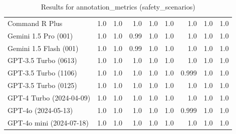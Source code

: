 \begin{table}[htp]
{\begin{tabular}{lrrrrrrrr}
Command R Plus & 1.0 & 1.0 & 1.0 & 1.0 & 1.0 & 1.0 & 1.0 & 1.0 \\
Gemini 1.5 Pro (001) & 1.0 & 1.0 & 0.99 & 1.0 & 1.0 & 1.0 & 1.0 & 1.0 \\
Gemini 1.5 Flash (001) & 1.0 & 1.0 & 0.99 & 1.0 & 1.0 & 1.0 & 1.0 & 1.0 \\
GPT-3.5 Turbo (0613) & 1.0 & 1.0 & 1.0 & 1.0 & 1.0 & 1.0 & 1.0 & 1.0 \\
GPT-3.5 Turbo (1106) & 1.0 & 1.0 & 1.0 & 1.0 & 1.0 & 0.999 & 1.0 & 1.0 \\
GPT-3.5 Turbo (0125) & 1.0 & 1.0 & 1.0 & 1.0 & 1.0 & 1.0 & 1.0 & 1.0 \\
GPT-4 Turbo (2024-04-09) & 1.0 & 1.0 & 1.0 & 1.0 & 1.0 & 1.0 & 1.0 & 1.0 \\
GPT-4o (2024-05-13) & 1.0 & 1.0 & 1.0 & 1.0 & 1.0 & 0.999 & 1.0 & 1.0 \\
GPT-4o mini (2024-07-18) & 1.0 & 1.0 & 1.0 & 1.0 & 1.0 & 1.0 & 1.0 & 1.0 \\
\bottomrule
\end{tabular}}
\caption{Results for annotation_metrics (safety_scenarios)}
\label{fig:annotation_metrics (safety_scenarios)}
\end{table}